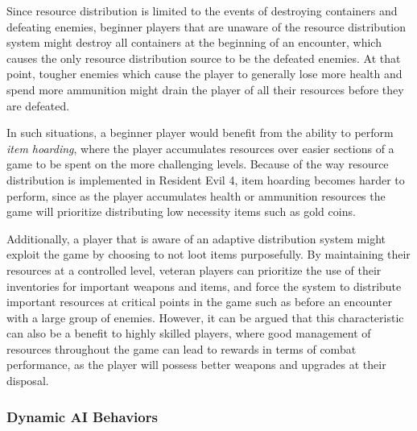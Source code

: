 Since resource distribution is limited to the events of destroying containers and defeating enemies, beginner players that are unaware of the resource distribution system might destroy all containers at the beginning of an encounter, which causes the only resource distribution source to be the defeated enemies. At that point, tougher enemies which cause the player to generally lose more health and spend more ammunition might drain the player of all their resources before they are defeated.

In such situations, a beginner player would benefit from the ability to perform \emph{item hoarding}, where the player accumulates resources over easier sections of a game to be spent on the more challenging levels. Because of the way resource distribution is implemented in Resident Evil 4, item hoarding becomes harder to perform, since as the player accumulates health or ammunition resources the game will prioritize distributing low necessity items such as gold coins.

Additionally, a player that is aware of an adaptive distribution system might exploit the game by choosing to not loot items purposefully. By maintaining their resources at a controlled level, veteran players can prioritize the use of their inventories for important weapons and items, and force the system to distribute important resources at critical points in the game such as before an encounter with a large group of enemies. However, it can be argued that this characteristic can also be a benefit to highly skilled players, where good management of resources throughout the game can lead to rewards in terms of combat performance, as the player will possess better weapons and upgrades at their disposal.

\subsubsection{Dynamic AI Behaviors}


